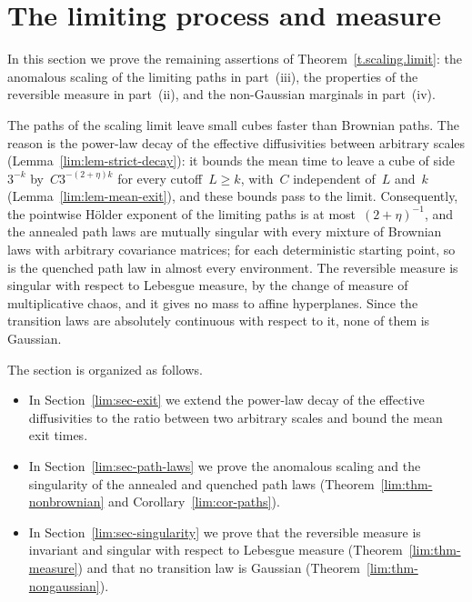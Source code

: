 \documentclass[11pt]{amsart}
\begin{document}
\section{The limiting process and measure}
\label{lim:sec-process-measure}

In this section we prove the remaining assertions of Theorem~\ref{t.scaling.limit}: the anomalous scaling of the limiting paths in part~(iii), the properties of the reversible measure in part~(ii), and the non-Gaussian marginals in part~(iv).

\smallskip

The paths of the scaling limit leave small cubes faster than Brownian paths. The reason is the power-law decay of the effective diffusivities between arbitrary scales (Lemma~\ref{lim:lem-strict-decay}): it bounds the mean time to leave a cube of side~$3^{-k}$ by~$C3^{-(2+\eta)k}$ for every cutoff~$L\geq k$, with~$C$ independent of~$L$ and~$k$ (Lemma~\ref{lim:lem-mean-exit}), and these bounds pass to the limit. Consequently, the pointwise H\"older exponent of the limiting paths is at most~$(2+\eta)^{-1}$, and the annealed path laws are mutually singular with every mixture of Brownian laws with arbitrary covariance matrices; for each deterministic starting point, so is the quenched path law in almost every environment. The reversible measure is singular with respect to Lebesgue measure, by the change of measure of multiplicative chaos, and it gives no mass to affine hyperplanes. Since the transition laws are absolutely continuous with respect to it, none of them is Gaussian.

\smallskip

The section is organized as follows.
\begin{itemize}
\item In Section~\ref{lim:sec-exit} we extend the power-law decay of the effective diffusivities to the ratio between two arbitrary scales and bound the mean exit times.

\item In Section~\ref{lim:sec-path-laws} we prove the anomalous scaling and the singularity of the annealed and quenched path laws (Theorem~\ref{lim:thm-nonbrownian} and Corollary~\ref{lim:cor-paths}).

\item In Section~\ref{lim:sec-singularity} we prove that the reversible measure is invariant and singular with respect to Lebesgue measure (Theorem~\ref{lim:thm-measure}) and that no transition law is Gaussian (Theorem~\ref{lim:thm-nongaussian}).
\end{itemize}
\end{document}
